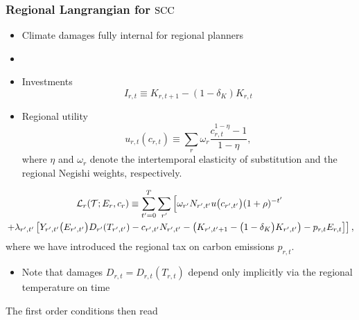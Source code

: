 \documentclass[preprint,3p,authoryear]{elsarticle}
\begin{document}
\subsubsection{Regional Langrangian for $\operatorname{SCC}$}
\label{sec:Lreg}
\begin{itemize}
\item Climate damages fully internal for regional planners
\item {}
\end{itemize}
\begin{itemize}
\item Investments
\begin{equation}
  \label{eq:Ir}
  I_{r,t}\equiv K_{r,t+1}-(1-\delta_K)K_{r,t}
\end{equation}

\item Regional utility
\begin{equation}
  \label{eq:ur}
  u_{r,t}(c_{r,t})\equiv\sum_r \omega_r\frac{c_{r,t}^{1-\eta}-1}{1-\eta},
\end{equation}
where $\eta$ and $\omega_r$ denote the intertemporal elasticity of substitution and the regional Negishi weights, respectively.
\end{itemize}
\begin{multline}
  \label{eq:Lreg} \mathcal{L}_r(\mathcal{T};E_r,c_r)\equiv\sum_{t'=0}^{T}\sum_{r'}\left[\omega_{r'}N_{r',t'}u\big(c_{r',t'}\big)(1+\rho)^{-t'}\right.\\
  \left.+\lambda_{r',t'}\left[Y_{r',t'}\big(E_{r',t'}\big)D_{r'}(T_{r',t'}) -c_{r',t'}N_{r',t'}-\left(K_{r',t'+1}-\big(1-\delta_K\big)K_{r',t'}\right)-p_{r,t}E_{r,t} \right]\right],
\end{multline}
where we have introduced the regional tax on carbon emissions $p_{r,t}$.
\begin{itemize}
\item Note that damages $D_{r,t}=D_{r,t}(T_{r,t})$ depend only implicitly via the regional temperature on time
\end{itemize}
The first order conditions then read
\end{document}
